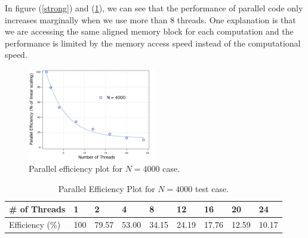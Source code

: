 \documentclass[a4paper,11pt]{article}
\begin{document}
	In figure (\ref{strong}) and (\ref{efficiency}), we can see that the performance of parallel code only increases marginally when we use more than 8 threads. One explanation is that we are accessing the same aligned memory block for each computation and the performance is limited by the memory access speed instead of the computational speed.
	\begin{figure}[H]
        \centering
                \includegraphics[width=0.5\textwidth]{efficiency.jpg}
                \caption {Parallel efficiency plot for $N = 4000$ case.}
                \label{efficiency}
	\end{figure}
	\begin{table}[H]
	\centering
	\label{my-label}
	\begin{tabular}{l|llllllll}
	\# of Threads   & 1   & 2     & 4     & 8     & 12    & 16    & 20    & 24    \\
	\hline
	Efficiency (\%) & 100 & 79.57 & 53.00 & 34.15 & 24.19 & 17.76 & 12.59 & 10.17
	\end{tabular}
	\caption{Parallel Efficiency Plot for $N = 4000$ test case.}
	\end{table}
\end{document}
